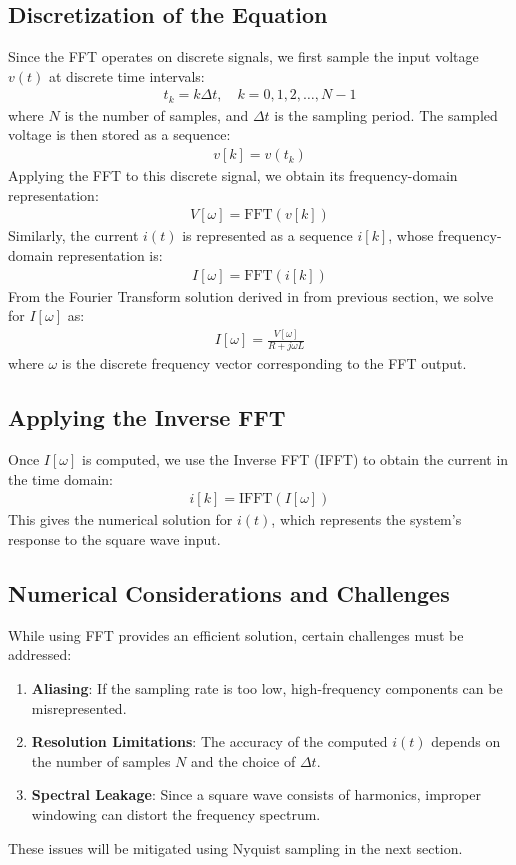 \documentclass[journal]{IEEEtran}
\begin{document}
\subsection{ Discretization of the Equation}
Since the FFT operates on discrete signals, we first sample the input voltage $v(t)$ at discrete time intervals:
\begin{align}
    t_k = k\Delta t, \quad k = 0, 1, 2,\dots, N-1
\end{align}
where $N$ is the number of samples, and $\Delta t$ is the sampling period. The sampled voltage is then stored as a sequence:
\begin{align}
    v[k] = v(t_k)
\end{align}
Applying the FFT to this discrete signal, we obtain its frequency-domain representation:
\begin{align}
    V[\omega] = \text{FFT}(v[k])
\end{align}
Similarly, the current $i(t)$ is represented as a sequence $i[k]$, whose frequency-domain representation is:
\begin{align}
    I[\omega] = \text{FFT}(i[k])
\end{align}
From the Fourier Transform solution derived in from previous section, we solve for $I[\omega]$ as:
\begin{align}
    I[\omega] = \frac{V[\omega]}{R + j\omega L}
\end{align}
where $\omega$ is the discrete frequency vector corresponding to the FFT output.
\subsection{Applying the Inverse FFT}
Once $I[\omega]$ is computed, we use the Inverse FFT (IFFT) to obtain the current in the time domain:
\begin{align}
    i[k] = \text{IFFT}(I[\omega])
\end{align}
This gives the numerical solution for $i(t)$, which represents the system's response to the square wave input.
\subsection{Numerical Considerations and Challenges
}
While using FFT provides an efficient solution, certain challenges must be addressed:
\begin{enumerate}
    \item \textbf{Aliasing}: If the sampling rate is too low, high-frequency components can be misrepresented.
    \item \textbf{Resolution Limitations}: The accuracy of the computed $i(t)$ depends on the number of samples $N$ and the choice of $\Delta t$.
    \item \textbf{Spectral Leakage}: Since a square wave consists of harmonics, improper windowing can distort the frequency spectrum.
\end{enumerate}
These issues will be mitigated using Nyquist sampling in the next section.
\end{document}
